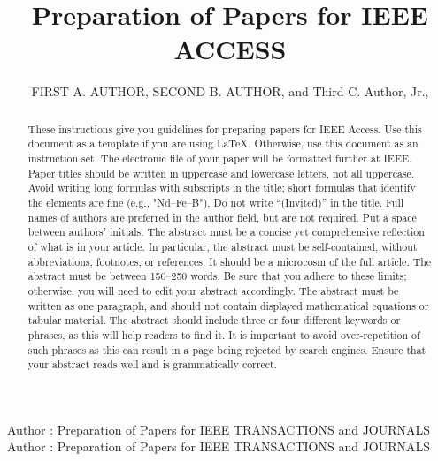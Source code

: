 \documentclass{ieeeaccess}
\begin{document}

\title{Preparation of Papers for IEEE ACCESS}
\author{\uppercase{First A. Author},
\uppercase{Second B. Author}, and Third C. Author,
Jr.,
}

\address[1]{National Institute of Standards and
Technology, Boulder, CO 80305 USA (e-mail: author@boulder.nist.gov)}
\address[2]{Department of Physics, Colorado State University, Fort Collins,
CO 80523 USA (e-mail: author@lamar.colostate.edu)}
\address[3]{Electrical Engineering Department, University of Colorado, Boulder, CO
80309 USA}

\markboth
{Author \headeretal: Preparation of Papers for IEEE TRANSACTIONS and JOURNALS}
{Author \headeretal: Preparation of Papers for IEEE TRANSACTIONS and JOURNALS}



\begin{abstract}
These instructions give you guidelines for preparing papers for
IEEE Access. Use this document as a template if you are
using \LaTeX. Otherwise, use this document as an
instruction set. The electronic file of your paper will be formatted further
at IEEE. Paper titles should be written in uppercase and lowercase letters,
not all uppercase. Avoid writing long formulas with subscripts in the title;
short formulas that identify the elements are fine (e.g., "Nd--Fe--B"). Do
not write ``(Invited)'' in the title. Full names of authors are preferred in
the author field, but are not required. Put a space between authors'
initials. The abstract must be a concise yet comprehensive reflection of
what is in your article. In particular, the abstract must be self-contained,
without abbreviations, footnotes, or references. It should be a microcosm of
the full article. The abstract must be between 150--250 words. Be sure that
you adhere to these limits; otherwise, you will need to edit your abstract
accordingly. The abstract must be written as one paragraph, and should not
contain displayed mathematical equations or tabular material. The abstract
should include three or four different keywords or phrases, as this will
help readers to find it. It is important to avoid over-repetition of such
phrases as this can result in a page being rejected by search engines.
Ensure that your abstract reads well and is grammatically correct.
\end{abstract}
\end{document}
